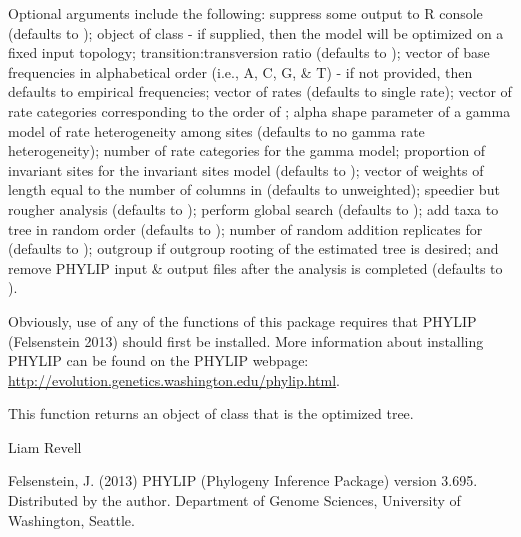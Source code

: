 \documentclass[a4paper]{book}
\begin{document}
\begin{Details}\relax
Optional arguments include the following:  suppress some output to R console (defaults to );  object of class  - if supplied, then the model will be optimized on a fixed input topology;  transition:transversion ratio (defaults to );  vector of base frequencies in alphabetical order (i.e., A, C, G, \& T) - if not provided, then defaults to empirical frequencies;  vector of rates (defaults to single rate);  vector of rate categories corresponding to the order of ;  alpha shape parameter of a gamma model of rate heterogeneity among sites (defaults to no gamma rate heterogeneity);  number of rate categories for the gamma model;  proportion of invariant sites for the invariant sites model (defaults to );  vector of weights of length equal to the number of columns in  (defaults to unweighted);  speedier but rougher analysis (defaults to );  perform global search (defaults to );  add taxa to tree in random order (defaults to );  number of random addition replicates for  (defaults to );  outgroup if outgroup rooting of the estimated tree is desired; and  remove PHYLIP input \& output files after the analysis is completed (defaults to ).

Obviously, use of any of the functions of this package requires that PHYLIP (Felsenstein 2013) should first be installed. More information about installing PHYLIP can be found on the PHYLIP webpage: \url{http://evolution.genetics.washington.edu/phylip.html}.
\end{Details}
%
\begin{Value}
This function returns an object of class  that is the optimized tree.
\end{Value}
%
\begin{Author}\relax
Liam Revell 
\end{Author}
%
\begin{References}\relax
Felsenstein, J. (2013) PHYLIP (Phylogeny Inference Package) version 3.695. Distributed by the author. Department of Genome Sciences, University of Washington, Seattle.
\end{References}
\end{document}
